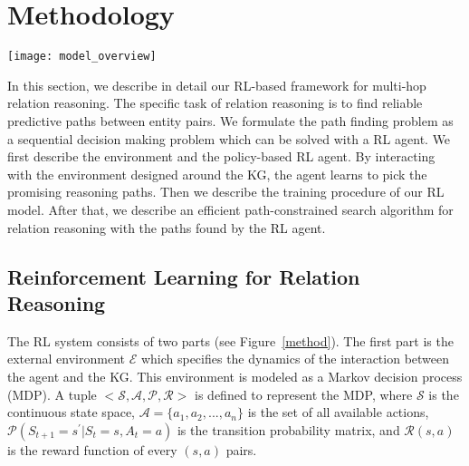 \documentclass[11pt,letterpaper]{article}
\begin{document}
\section{Methodology}
\label{sec:methodology}
\begin{figure*}
\texttt{[image: model\_overview]}
\caption{Overview of our RL model. \textbf{Left:} The KG environment $\mathcal{E}$ modeled by a MDP. The dotted arrows (partially) show the existing relation links in the KG and the bold arrows show the reasoning paths found by the RL agent. $^{-1}$ denotes the inverse of an relation. \textbf{Right:} The structure of the policy network agent. At each step, by interacting with the environment, the agent learns to pick a relation link to extend the reasoning paths.}
\label{method}
\end{figure*}

In this section, we describe in detail our RL-based framework for multi-hop relation reasoning. The specific task of relation reasoning is to find reliable predictive paths between entity pairs. We formulate the path finding problem as a sequential decision making problem which can be solved with a RL agent. We first describe the environment and the policy-based RL agent. By interacting with the environment designed around the KG, the agent learns to pick the promising reasoning paths. Then we describe the training procedure of our RL model. After that, we describe an efficient path-constrained search algorithm for  relation reasoning with the paths found by the RL agent.
\subsection{Reinforcement Learning for Relation Reasoning}
The RL system consists of two parts (see Figure~\ref{method}). The first part is the external environment $\mathcal{E}$ which specifies the dynamics of the interaction between the agent and the KG. This environment is modeled as a Markov decision process (MDP). A tuple $<\mathcal{S,A,P,R}>$ is defined to represent the MDP, where $\mathcal{S}$ is the continuous state space, $\mathcal{A} = \{a_1,a_2,...,a_n\}$ is the set of all available actions, $\mathcal{P}(S_{t+1}=s^{'}|S_t=s,A_t=a)$ is the transition probability matrix, and $\mathcal{R}(s,a)$ is the reward function of every $(s,a)$ pairs. 
\end{document}
